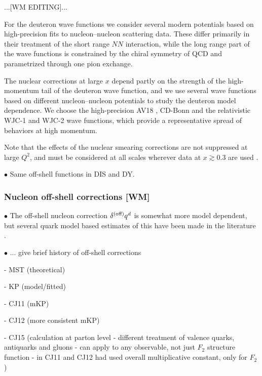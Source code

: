 \documentclass[aps,prd,amsmath,preprint]{revtex4}
\begin{document}
{\color{red} ...[WM EDITING]...}


For the deuteron wave functions we consider several modern potentials
based on high-precision fits to nucleon--nucleon scattering data.
These differ primarily in their treatment of the short range $NN$
interaction, while the long range part of the wave functions is
constrained by the chiral symmetry of QCD and parametrized through one
pion exchange.



The nuclear corrections at large $x$ depend partly on the strength
of the high-momentum tail of the deuteron wave function, and we use
several wave functions based on different nucleon--nucleon potentials
to study the deuteron model dependence.  We choose the high-precision
AV18 \cite{AV18}, CD-Bonn \cite{CDBonn} and the relativistic WJC-1
and WJC-2 \cite{WJC} wave functions, which provide a representative
spread of behaviors at high momentum.

Note that the effects of the nuclear smearing corrections are not
suppressed at large $Q^2$, and must be considered at all scales
wherever data at $x \gtrsim 0.3$ are used \cite{CJ10, ACHL09, ARM12}.


$\bullet$
Same off-shell functions in DIS and DY.



\subsubsection{Nucleon off-shell corrections {\color{red} [WM]}}
\label{sssec:offshell}


$\bullet$
The off-shell nucleon correction $\delta^{(\rm off)} q^d$ is somewhat
more model dependent, but several quark model based estimates of this
have been made in the literature \cite{KP06, GL92, MSTplb}.


$\bullet$
... give brief history of off-shell corrections

- MST (theoretical)

- KP (model/fitted)

- CJ11 (mKP)

- CJ12 (more consistent mKP)

- CJ15 (calculation at parton level - different treatment of 
  valence quarks, antiquarks and gluons - can apply to any
  observable, not just $F_2$ structure function - in CJ11 and CJ12
  had used overall multiplicative constant, only for $F_2$)
\end{document}
